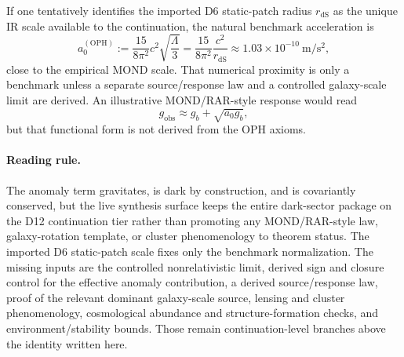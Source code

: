 If one tentatively identifies the imported D6 static-patch radius \(r_{\mathrm{dS}}\) as the
unique IR scale available to the continuation, the natural benchmark acceleration is
\[
a_0^{(\mathrm{OPH})}
:=
\frac{15}{8\pi^2}c^2\sqrt{\frac{\Lambda}{3}}
=
\frac{15}{8\pi^2}\frac{c^2}{r_{\mathrm{dS}}}
\approx
1.03\times 10^{-10}\ \mathrm{m/s^2},
\]
close to the empirical MOND scale. That numerical proximity is only a benchmark unless a separate
source/response law and a controlled galaxy-scale limit are derived. An illustrative MOND/RAR-style response would read
\[
g_{\mathrm{obs}}\approx g_b+\sqrt{a_0 g_b},
\]
but that functional form is not derived from the OPH axioms.

\paragraph{\textbf{Reading rule.}}
The anomaly term gravitates, is dark by construction, and is covariantly conserved, but the live
synthesis surface keeps the entire dark-sector package on the D12 continuation tier rather than
promoting any MOND/RAR-style law, galaxy-rotation template, or cluster phenomenology to theorem
status. The imported D6 static-patch scale fixes only the benchmark normalization. The missing
inputs are the controlled nonrelativistic limit, derived sign and closure control for the
effective anomaly contribution, a derived source/response law, proof of the relevant dominant
galaxy-scale source, lensing and cluster phenomenology, cosmological abundance and
structure-formation checks, and environment/stability bounds. Those remain continuation-level
branches above the identity written here.
